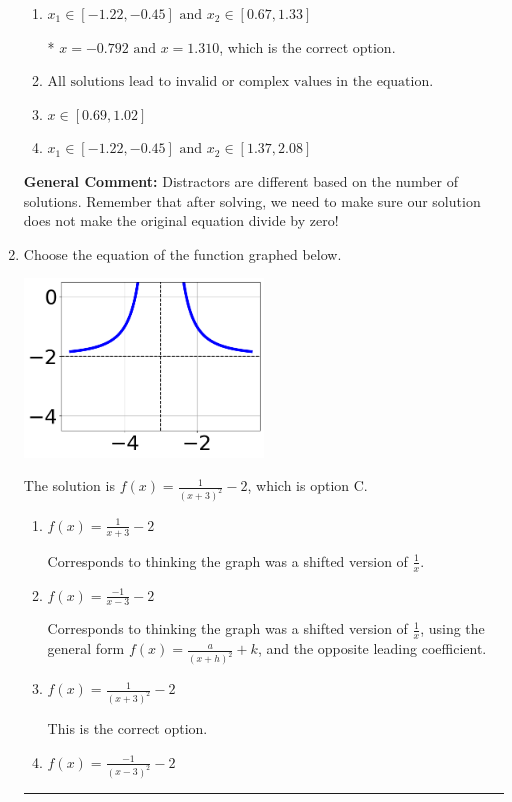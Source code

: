 \documentclass{extbook}[14pt]
\newcommand{\litem}[1]{\item #1

\rule{\textwidth}{0.4pt}}
\begin{document}
\begin{enumerate}
{\begin{enumerate}[label=\Alph*.]
\item \( x_1 \in [-1.22, -0.45] \text{ and } x_2 \in [0.67,1.33] \)

* $x = -0.792 \text{ and } x = 1.310$, which is the correct option.
\item \( \text{All solutions lead to invalid or complex values in the equation.} \)


\item \( x \in [0.69,1.02] \)


\item \( x_1 \in [-1.22, -0.45] \text{ and } x_2 \in [1.37,2.08] \)


\end{enumerate}

\textbf{General Comment:} Distractors are different based on the number of solutions. Remember that after solving, we need to make sure our solution does not make the original equation divide by zero!
}
\litem{
Choose the equation of the function graphed below.

\begin{center}
    \includegraphics[width=0.5\textwidth]{../Figures/rationalGraphToEquationB.png}
\end{center}


The solution is \( f(x) = \frac{1}{(x + 3)^2} - 2 \), which is option C.\begin{enumerate}[label=\Alph*.]
\item \( f(x) = \frac{1}{x + 3} - 2 \)

Corresponds to thinking the graph was a shifted version of $\frac{1}{x}$.
\item \( f(x) = \frac{-1}{x - 3} - 2 \)

Corresponds to thinking the graph was a shifted version of $\frac{1}{x}$, using the general form $f(x) = \frac{a}{(x+h)^2}+k$, and the opposite leading coefficient.
\item \( f(x) = \frac{1}{(x + 3)^2} - 2 \)

This is the correct option.
\item \( f(x) = \frac{-1}{(x - 3)^2} - 2 \)


\end{enumerate}}
\end{enumerate}
\end{document}
